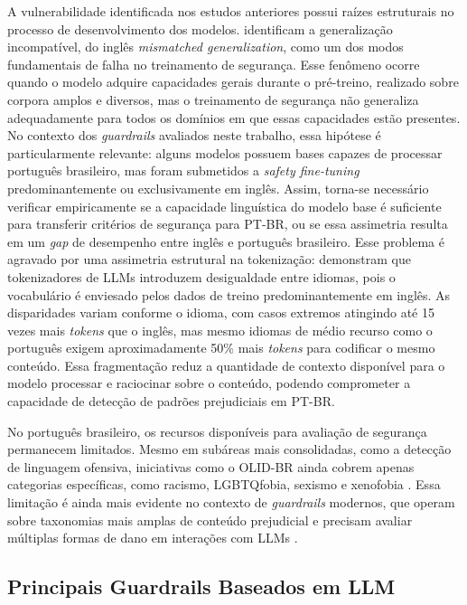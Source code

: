 A vulnerabilidade identificada nos estudos anteriores possui raízes estruturais no processo de desenvolvimento dos modelos.  identificam a generalização incompatível, do inglês \textit{mismatched generalization}, como um dos modos fundamentais de falha no treinamento de segurança. Esse fenômeno ocorre quando o modelo adquire capacidades gerais durante o pré-treino, realizado sobre corpora amplos e diversos, mas o treinamento de segurança não generaliza adequadamente para todos os domínios em que essas capacidades estão presentes. No contexto dos \textit{guardrails} avaliados neste trabalho, essa hipótese é particularmente relevante: alguns modelos possuem bases capazes de processar português brasileiro, mas foram submetidos a \textit{safety fine-tuning} predominantemente ou exclusivamente em inglês. Assim, torna-se necessário verificar empiricamente se a capacidade linguística do modelo base é suficiente para transferir critérios de segurança para PT-BR, ou se essa assimetria resulta em um \textit{gap} de desempenho entre inglês e português brasileiro. Esse problema é agravado por uma assimetria estrutural na tokenização:  demonstram que tokenizadores de LLMs introduzem desigualdade entre idiomas, pois o vocabulário é enviesado pelos dados de treino predominantemente em inglês. As disparidades variam conforme o idioma, com casos extremos atingindo até 15 vezes mais \textit{tokens} que o inglês, mas mesmo idiomas de médio recurso como o português exigem aproximadamente 50\% mais \textit{tokens} para codificar o mesmo conteúdo. Essa fragmentação reduz a quantidade de contexto disponível para o modelo processar e raciocinar sobre o conteúdo, podendo comprometer a capacidade de detecção de padrões prejudiciais em PT-BR. 

No português brasileiro, os recursos disponíveis para avaliação de segurança permanecem limitados. Mesmo em subáreas mais consolidadas, como a detecção de linguagem ofensiva, iniciativas como o OLID-BR ainda cobrem apenas categorias específicas, como racismo, LGBTQfobia, sexismo e xenofobia \cite{trajano2024olid}. Essa limitação é ainda mais evidente no contexto de \textit{guardrails} modernos, que operam sobre taxonomias mais amplas de conteúdo prejudicial e precisam avaliar múltiplas formas de dano em interações com LLMs \cite{inan2023llamaguard,zeng2024shieldgemma,ghosh2025ailuminate}.

\subsection{Principais Guardrails Baseados em LLM}
\label{sec:modelos-guardrails}

